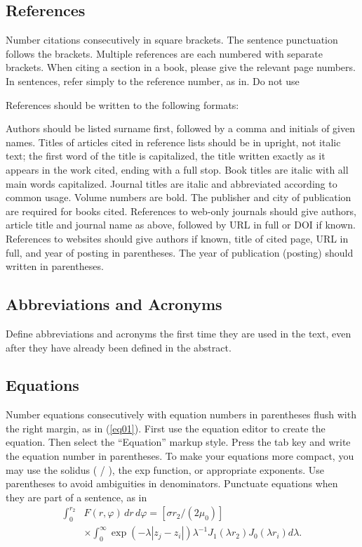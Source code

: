 \documentclass{fullpaper_hutech}
\begin{document}
\subsection{References}

Number citations consecutively in square brackets. The sentence punctuation follows the brackets. Multiple references are each numbered with separate brackets. When citing a section in a book, please give the relevant page numbers. In sentences, refer simply to the reference number, as in. Do not use 

References should be written to the following formats:

Authors should be listed surname first, followed by a comma and initials of given names. Titles of articles cited in reference lists should be in upright, not italic text; the first word of the title is capitalized, the title written exactly as it appears in the work cited, ending with a full stop. Book titles are italic with all main words capitalized. Journal titles are italic and abbreviated according to common usage. Volume numbers are bold. The publisher and city of publication are required for books cited. References to web-only journals should give authors, article title and journal name as above, followed by URL in full or DOI if known. References to websites should give authors if known, title of cited page, URL in full, and year of posting in parentheses. The year of publication (posting) should written in parentheses.

\subsection{Abbreviations and Acronyms}

Define abbreviations and acronyms the first time they are used in the text, even after they have already been defined in the abstract.

\subsection{Equations}

Number equations consecutively with equation numbers in parentheses flush with the right margin, as in (\ref{eq01}). First use the equation editor to create the equation. Then select the ``Equation'' markup style. Press the tab key and write the equation number in parentheses. To make your equations more compact, you may use the solidus ( / ), the exp function, or appropriate exponents. Use parentheses to avoid ambiguities in denominators. Punctuate equations when they are part of a sentence, as in
\begin{equation}\label{eq01}
\begin{split}\int_0^{r_2} &F(r,\varphi)\,dr\,d\varphi=[\sigma r_2 /(2\mu_0 )] \\
&\times\int_0^{\infty} \exp(-\lambda |z_j -z_i |)\lambda^{-1} J_1 (\lambda r_2 )J_0 (\lambda r_i )d\lambda.\end{split}
\end{equation}
\end{document}
